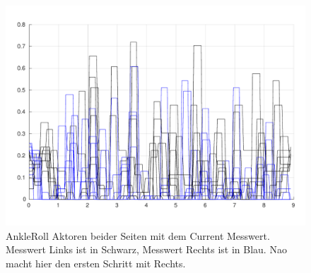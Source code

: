 \begin{figure}[tb]
	\centering
	\includegraphics[width=1\linewidth]{Bilder/AnkleRoll_beide_current_rechts_anfang.pdf}
	\caption{AnkleRoll Aktoren beider Seiten mit dem Current Messwert. Messwert Links ist in Schwarz, Messwert Rechts ist in Blau. Nao macht hier den ersten Schritt mit Rechts.}
	\label{AnkleRoll_beide_current_rechts_anfang}
\end{figure}
